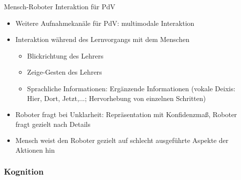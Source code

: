 \documentclass[paper=a4, fontsize=11pt]{scrartcl} %
\numberwithin{equation}{section} %
\numberwithin{figure}{section} %
\numberwithin{table}{section} %
\begin{document}
Mensch-Roboter Interaktion für PdV
\begin{itemize}
\item Weitere Aufnahmekanäle für PdV: multimodale Interaktion
\item Interaktion während des Lernvorgangs mit dem Menschen
\begin{itemize}
\item Blickrichtung des Lehrers
\item Zeige-Gesten des Lehrers
\item Sprachliche Informationen: Ergänzende Informationen (vokale Deixis: Hier, Dort, Jetzt,...; Hervorhebung von einzelnen Schritten)
\end{itemize}
\item Roboter fragt bei Unklarheit: Repräsentation mit Konfidenzmaß, Roboter fragt gezielt nach Details
\item Mensch weist den Roboter gezielt auf schlecht ausgeführte Aspekte der Aktionen hin
\end{itemize}

\subsubsection{Kognition}
\end{document}
